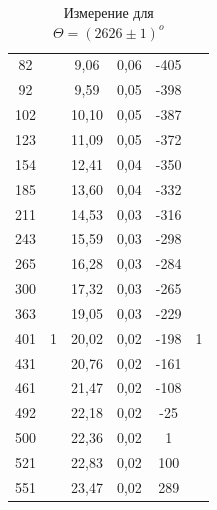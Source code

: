 \documentclass[a4paper,12pt]{report}
\begin{document}
\begin{table}[H]
\begin{tabular}{|c|c|c|c|c|c|}
82                            &                                       & 9,06                              & 0,06                              & -405                         &                                      \\ \cline{1-1} \cline{3-5}
92                            &                                       & 9,59                              & 0,05                              & -398                         &                                      \\ \cline{1-1} \cline{3-5}
102                           &                                       & 10,10                             & 0,05                              & -387                         &                                      \\ \cline{1-1} \cline{3-5}
123                           &                                       & 11,09                             & 0,05                              & -372                         &                                      \\ \cline{1-1} \cline{3-5}
154                           &                                       & 12,41                             & 0,04                              & -350                         &                                      \\ \hline
185 & \multirow{13}{*}{1} & 13,60 & 0,04 & -332 & \multirow{13}{*}{1} \\ \cline{1-1} \cline{3-5}
211 &                     & 14,53 & 0,03 & -316 &                     \\ \cline{1-1} \cline{3-5}
243 &                     & 15,59 & 0,03 & -298 &                     \\ \cline{1-1} \cline{3-5}
265 &                     & 16,28 & 0,03 & -284 &                     \\ \cline{1-1} \cline{3-5}
300 &                     & 17,32 & 0,03 & -265 &                     \\ \cline{1-1} \cline{3-5}
363 &                     & 19,05 & 0,03 & -229 &                     \\ \cline{1-1} \cline{3-5}
401 &                     & 20,02 & 0,02 & -198 &                     \\ \cline{1-1} \cline{3-5}
431 &                     & 20,76 & 0,02 & -161 &                     \\ \cline{1-1} \cline{3-5}
461 &                     & 21,47 & 0,02 & -108 &                     \\ \cline{1-1} \cline{3-5}
492 &                     & 22,18 & 0,02 & -25  &                     \\ \cline{1-1} \cline{3-5}
500 &                     & 22,36 & 0,02 & 1    &                     \\ \cline{1-1} \cline{3-5}
521 &                     & 22,83 & 0,02 & 100  &                     \\ \cline{1-1} \cline{3-5}
551 &                     & 23,47 & 0,02 & 289  &                     \\ \hline
\end{tabular}
\caption{Измерение для $\Theta = (2626\pm 1) ^{o}$}
\end{table}
\end{document}
